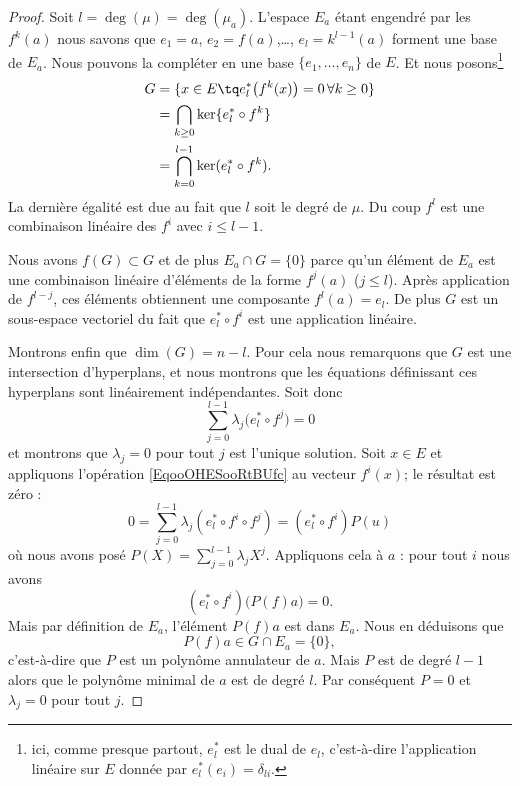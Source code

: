 \begin{proof}
    Soit \( l=\deg(\mu)=\deg(\mu_a)\). L'espace \( E_a\) étant engendré par les \( f^k(a)\) nous savons que \( e_1=a\), \( e_2=f(a)\),\ldots, \( e_l=k^{l-1}(a)\) forment une base de \( E_a\). Nous pouvons la compléter en une base \( \{ e_1,\ldots, e_n \}\) de \( E\). Et nous posons\footnote{ici, comme presque partout, \( e^*_{l}\) est le dual de \( e_l\), c'est-à-dire l'application linéaire sur \( E\) donnée par \( e^*_l(e_i)=\delta_{li}\). }
    \begin{subequations}
        \begin{align}
            G&=\{ x\in E\tq e^*_l\big( f^k(x) \big)=0\,\forall k\geq 0 \}\\
            &=\bigcap_{k\geq 0}\ker\{ e^*_l\circ f^k \}\\
            &=\bigcap_{k=0}^{l-1}\ker(  e^*_l\circ f^k ).
        \end{align}
    \end{subequations}
    La dernière égalité est due au fait que \( l\) soit le degré de \( \mu\). Du coup \( f^l\) est une combinaison linéaire des \( f^i\) avec \( i\leq l-1\).

    Nous avons \( f(G)\subset G\) et de plus \( E_a\cap G=\{ 0 \}\) parce qu'un élément de \( E_a\) est une combinaison linéaire d'éléments de la forme \( f^j(a)\) (\( j\leq l\)). Après application de \( f^{l-j}\), ces éléments obtiennent une composante \( f^l(a)=e_l\). De plus \( G\) est un sous-espace vectoriel du fait que \( e^*_l\circ f^i\) est une application linéaire.

    Montrons enfin que \( \dim(G)=n-l\). Pour cela nous remarquons que \( G\) est une intersection d'hyperplans, et nous montrons que les équations définissant ces hyperplans sont linéairement indépendantes. Soit donc
    \begin{equation}        \label{EqooOHESooRtBUfc}
        \sum_{j=0}^{l-1}\lambda_j\big( e^*_l\circ f^j \big)=0
    \end{equation}
    et montrons que \( \lambda_j=0\) pour tout $j$ est l'unique solution. Soit \( x\in E\) et appliquons l'opération \eqref{EqooOHESooRtBUfc} au vecteur \( f^i(x)\); le résultat est zéro :
    \begin{equation}
        0=\sum_{j=0}^{l-1}\lambda_j(e^*_l\circ f^i\circ f^j)=(e^*_l\circ f^i)P(u)
    \end{equation}
    où nous avons posé \( P(X)=\sum_{j=0}^{l-1}\lambda_jX^j\). Appliquons cela à \( a\) : pour tout \( i\) nous avons
    \begin{equation}
        (e^*_l\circ f^i)\big( P(f)a \big)=0.
    \end{equation}
    Mais par définition de \( E_a\), l'élément \(P(f)a \) est dans \( E_a\). Nous en déduisons que
    \begin{equation}
        P(f)a\in G\cap E_a=\{ 0 \},
    \end{equation}
    c'est-à-dire que \( P\) est un polynôme annulateur de \( a\). Mais \( P\) est de degré \( l-1\) alors que le polynôme minimal de \( a\) est de degré \( l\). Par conséquent \( P=0\) et \( \lambda_j=0\) pour tout \( j\).
\end{proof}

